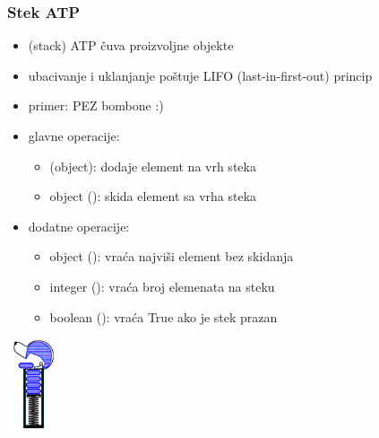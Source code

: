 \documentclass[compress,aspectratio=169]{beamer}
\begin{document}
\begin{frame}[fragile]
  \frametitle{Stek ATP}
  \begin{itemize}
    \item {} (stack) ATP čuva proizvoljne objekte
    \item ubacivanje i uklanjanje poštuje LIFO (last-in-first-out) princip
    \item primer: PEZ bombone :)
    \item glavne operacije:
    \begin{itemize}
      \item {}(object): dodaje element na vrh steka
      \item object (): skida element sa vrha steka
    \end{itemize}
    \item dodatne operacije:
    \begin{itemize}
      \item object (): vraća najviši element bez skidanja
      \item integer (): vraća broj elemenata na steku
      \item boolean (): vraća True ako je stek prazan
    \end{itemize}
  \end{itemize}
  \begin{center}
    \includegraphics[width=1.5cm]{asp-05-pic01.png}
  \end{center}
\end{frame}
\end{document}
